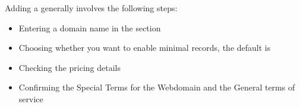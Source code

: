 \documentclass[letterpaper,10pt,english]{sphinxmanual}
\begin{document}
\sphinxAtStartPar
Adding a  generally involves the following steps:
\begin{itemize}
\item {} 
\sphinxAtStartPar
Entering a domain name in the  section

\item {} 
\sphinxAtStartPar
Choosing whether you want to enable minimal records, the default is 

\item {} 
\sphinxAtStartPar
Checking the pricing details

\item {} 
\sphinxAtStartPar
Confirming the Special Terms for the Webdomain and the General terms of service

\end{itemize}
\end{document}
